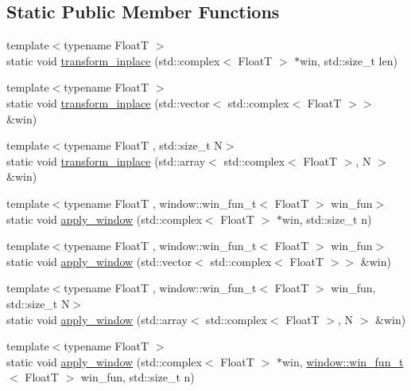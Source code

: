 \subsection*{Static Public Member Functions}
\begin{DoxyCompactItemize}
\item 
{\footnotesize template$<$typename FloatT $>$ }\\static void \hyperlink{structdevfix_1_1dsp_1_1fft_af0c91dff74868f580ad295448e50693f}{transform\+\_\+inplace} (std\+::complex$<$ FloatT $>$ $\ast$win, std\+::size\+\_\+t len)
\item 
{\footnotesize template$<$typename FloatT $>$ }\\static void \hyperlink{structdevfix_1_1dsp_1_1fft_ae3d7d5529ffad8aa929c5353252df7f5}{transform\+\_\+inplace} (std\+::vector$<$ std\+::complex$<$ FloatT $>$$>$ \&win)
\item 
{\footnotesize template$<$typename FloatT , std\+::size\+\_\+t N$>$ }\\static void \hyperlink{structdevfix_1_1dsp_1_1fft_a56cf2ee0f12d0a4c4bdcded3db38e088}{transform\+\_\+inplace} (std\+::array$<$ std\+::complex$<$ FloatT $>$, N $>$ \&win)
\item 
{\footnotesize template$<$typename FloatT , window\+::win\+\_\+fun\+\_\+t$<$ Float\+T $>$ win\+\_\+fun$>$ }\\static void \hyperlink{structdevfix_1_1dsp_1_1fft_af29ead88d72ee8c63bb776e46b107d64}{apply\+\_\+window} (std\+::complex$<$ FloatT $>$ $\ast$win, std\+::size\+\_\+t n)
\item 
{\footnotesize template$<$typename FloatT , window\+::win\+\_\+fun\+\_\+t$<$ Float\+T $>$ win\+\_\+fun$>$ }\\static void \hyperlink{structdevfix_1_1dsp_1_1fft_a0156895b3faa9ae09a28362b8db9c8cf}{apply\+\_\+window} (std\+::vector$<$ std\+::complex$<$ FloatT $>$$>$ \&win)
\item 
{\footnotesize template$<$typename FloatT , window\+::win\+\_\+fun\+\_\+t$<$ Float\+T $>$ win\+\_\+fun, std\+::size\+\_\+t N$>$ }\\static void \hyperlink{structdevfix_1_1dsp_1_1fft_a57f8a79e855a66b88eb3281b6e0797ac}{apply\+\_\+window} (std\+::array$<$ std\+::complex$<$ FloatT $>$, N $>$ \&win)
\item 
{\footnotesize template$<$typename FloatT $>$ }\\static void \hyperlink{structdevfix_1_1dsp_1_1fft_a715dd18ec8a7c196a2b1879c072b7094}{apply\+\_\+window} (std\+::complex$<$ FloatT $>$ $\ast$win, \hyperlink{structdevfix_1_1dsp_1_1window_ab2d2c0c5f5fca6dbcf91895115b69eac}{window\+::win\+\_\+fun\+\_\+t}$<$ FloatT $>$ win\+\_\+fun, std\+::size\+\_\+t n)

\end{DoxyCompactItemize}
